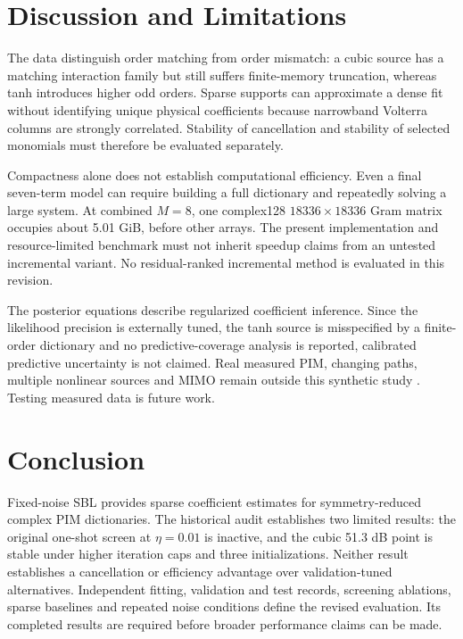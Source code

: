 \documentclass[conference]{IEEEtran}
\begin{document}
\section{Discussion and Limitations}\label{sec:discussion}
The data distinguish order matching from order mismatch: a cubic source has a matching interaction family but still suffers finite-memory truncation, whereas tanh introduces higher odd orders. Sparse supports can approximate a dense fit without identifying unique physical coefficients because narrowband Volterra columns are strongly correlated. Stability of cancellation and stability of selected monomials must therefore be evaluated separately.

Compactness alone does not establish computational efficiency. Even a final seven-term model can require building a full dictionary and repeatedly solving a large system. At combined $M=8$, one complex128 $18336\times18336$ Gram matrix occupies about 5.01 GiB, before other arrays. The present implementation and resource-limited benchmark must not inherit speedup claims from an untested incremental variant. No residual-ranked incremental method is evaluated in this revision.

The posterior equations describe regularized coefficient inference. Since the likelihood precision is externally tuned, the tanh source is misspecified by a finite-order dictionary and no predictive-coverage analysis is reported, calibrated predictive uncertainty is not claimed. Real measured PIM, changing paths, multiple nonlinear sources and MIMO remain outside this synthetic study \cite{Lampu2023Algorithms,Lampu2023Cascade}. Testing measured data is future work.

\section{Conclusion}\label{sec:concl}
Fixed-noise SBL provides sparse coefficient estimates for symmetry-reduced complex PIM dictionaries. The historical audit establishes two limited results: the original one-shot screen at $\eta=0.01$ is inactive, and the cubic 51.3 dB point is stable under higher iteration caps and three initializations. Neither result establishes a cancellation or efficiency advantage over validation-tuned alternatives. Independent fitting, validation and test records, screening ablations, sparse baselines and repeated noise conditions define the revised evaluation. Its completed results are required before broader performance claims can be made.



\end{document}
